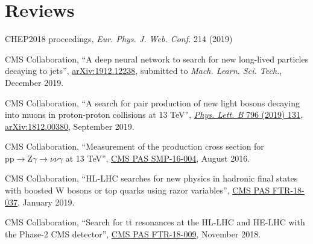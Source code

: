 \section{Reviews}
\begin{description}[leftmargin=12pt,font=\normalfont\textit]
\item[Journal referee:]
\begin{description}[leftmargin=12pt,font=\normalfont,labelsep=0em]\item[]
\item CHEP2018 proceedings, \emph{Eur. Phys. J. Web. Conf.} 214 (2019)
\end{description}
\item[Analysis Review Committee (ARC) member:]
\begin{description}[leftmargin=12pt,font=\normalfont,labelsep=0em]\item[]
\item CMS Collaboration, ``A deep neural network to search for new long-lived particles decaying to jets'', \href{https://arxiv.org/abs/1912.12238}{arXiv:1912.12238}, submitted to \emph{Mach. Learn. Sci. Tech.}, December 2019.
\item \begin{sloppypar}CMS Collaboration, ``A search for pair production of new light bosons decaying into muons in proton-proton collisions at 13 TeV'', \href{http://dx.doi.org/10.1016/j.physletb.2019.07.013}{\emph{Phys. Lett. B} 796 (2019) 131}, \href{https://arxiv.org/abs/1812.00380}{arXiv:1812.00380}, September 2019.\end{sloppypar}
\item CMS Collaboration, ``Measurement of the production cross section for $\text{p}\text{p} \to \text{Z}\gamma \to \nu\nu\gamma$ at 13 TeV'', \href{https://cds.cern.ch/record/2204922}{CMS PAS SMP-16-004}, August 2016.
\end{description}
\item[CMS Certified Language Editor (CCLE):]
\begin{description}[leftmargin=12pt,font=\normalfont,labelsep=0em]\item[]
\item CMS Collaboration, ``HL-LHC searches for new physics in hadronic final states with boosted W bosons or top quarks using razor variables'', \href{https://cds.cern.ch/record/2658262}{CMS PAS FTR-18-037}, January 2019.
\item CMS Collaboration, ``Search for $\text{t}\bar{\text{t}}$ resonances at the HL-LHC and HE-LHC with the Phase-2 CMS detector'', \href{https://cds.cern.ch/record/2649032}{CMS PAS FTR-18-009}, November 2018.

\end{description}
\end{description}
